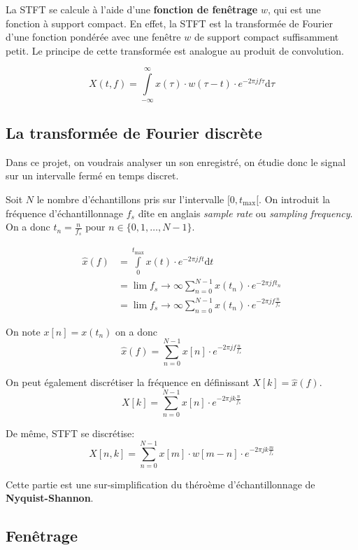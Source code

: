 \documentclass[]{article}
\begin{document}
La STFT se calcule à l'aide d'une \textbf{fonction de fenêtrage} \(w\),
qui est une fonction à support compact. En effet, la STFT est la
transformée de Fourier d'une fonction pondérée avec une fenêtre \(w\) de
support compact suffisamment petit. Le principe de cette transformée est
analogue au produit de convolution.

\[X(t, f) = \int\limits_{-\infty}^{\infty} x(\tau)\cdot w(\tau-t)\cdot e^{-2\pi j f\tau} \mathrm{d}\tau \]

\hypertarget{la-transformee-de-fourier-discrete}{%
\subsection{La transformée de Fourier
discrète}\label{la-transformee-de-fourier-discrete}}

Dans ce projet, on voudrais analyser un son enregistré, on étudie donc
le signal sur un intervalle fermé en temps discret.

Soit \(N\) le nombre d'échantillons pris sur l'intervalle
\([0,t_{\text{max}}[\). On introduit la fréquence d'échantillonnage
\(f_s\) dîte en anglais \emph{sample rate} ou \emph{sampling frequency}.
On a donc \(t_n = \frac{n}{f_s}\) pour \(n\in\{0,1,\dots,N-1\}\).

\begin{align}
\hat{x}(f) &= \int\limits_{0}^{t_{\text{max}}} x(t)\cdot e^{-2\pi j ft}\mathrm{d}t \\
    &= \lim\limits{f_s\rightarrow\infty} \sum\limits_{n=0}^{N-1} x(t_n)\cdot e^{-2\pi j ft_n}\\
    &= \lim\limits{f_s\rightarrow\infty} \sum\limits_{n=0}^{N-1} x(t_n)\cdot e^{-2\pi j f \frac{n}{f_s}}
\end{align}

On note \(x[n] = x(t_n)\) on a donc
\[ \hat{x}(f) = \sum\limits_{n=0}^{N-1} x[n]\cdot e^{-2\pi j f \frac{n}{f_s}}\]

On peut également discrétiser la fréquence en définissant
\(X[k]=\hat{x}(f)\).
\[ X[k] = \sum\limits_{n=0}^{N-1} x[n]\cdot e^{-2\pi j k \frac{n}{f_s}}\]

De même, STFT se discrétise:
\[X[n, k] = \sum\limits_{n=0}^{N-1} x[m]\cdot w[m-n]\cdot e^{-2\pi j k \frac{m}{f_s}}\]

Cette partie est une sur-simplification du théroème d'échantillonnage de
\textbf{Nyquist-Shannon}.

\hypertarget{fenetrage}{%
\subsection{Fenêtrage}\label{fenetrage}}
\end{document}
